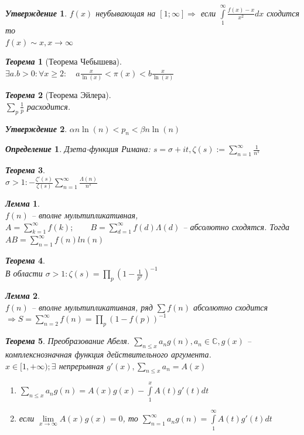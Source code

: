 \documentclass[a4paper,12pt]{article}
\newtheorem{deff2}{\textit{Определение}}
\newtheorem{teo2}{\textit{Теорема}}
\newtheorem{utv2}{\textit{Утверждение}}
\newtheorem{lem2}{\textit{Лемма}}
\newcommand{\q}{\quad}
\newcommand{\Ra}{\Rightarrow}
\newcommand{\bb}[1]{\mathbb{#1}}
\newcommand{\SL}{\sum\limits}
\newcommand{\IL}{\int\limits}
\begin{document}
\begin{utv2} $f(x)$ неубывающая на $[1;\infty]\Ra$ если $\IL_1^\infty \frac{f(x) - x}{x^2}dx$ сходится то \\$f(x)\sim x, x\to\infty$
\end{utv2}
\begin{teo2}[Теорема Чебышева]\q\\
$\exists a.b > 0: \forall x \ge 2:\q a\frac{x}{\ln(x)} <\pi(x) <b\frac{x}{\ln(x)} $
\end{teo2}
\begin{teo2}[Теорема Эйлера]\q\\$\sum_p \frac{1}{p}$ расходится.
\end{teo2}
\begin{utv2} $\alpha n \ln(n) < p_n < \beta n \ln(n)   $
\end{utv2}

\begin{deff2}
Дзета-функция Римана: $s = \sigma + it, \zeta (s) := \SL_{n=1}^\infty \frac{1}{n^s}$
\end{deff2}

\begin{teo2}\q\\
$\sigma > 1: -\frac{\zeta'(s)}{\zeta(s)}  \SL_{n=1}^\infty \frac{\Lambda(n)}{n^s} $
\end{teo2}
\begin{lem2}\q\\
$f(n)$ -- вполне мультипликативная, $A = \SL_{k=1}^\infty f(k);\q\q B = \SL_{d=1}^\infty f(d)\Lambda(d)$ -- абсолютно сходятся. Тогда $AB = \SL_{n=1}^\infty f(n) ln(n)$
\end{lem2}
\begin{teo2}\q\\
В области $\sigma > 1: \zeta(s) = \prod\limits_p (1 - \frac{1}{p^s})^{-1}$
\end{teo2}
\begin{lem2}\q\\
$f(n)$ -- вполне мультипликативная, ряд $\sum f(n)$ абсолютно сходится $\Ra S = \SL_{n=2}^\infty f(n) = \prod\limits_p (1-f(p))^{-1}  $
\end{lem2}
\begin{teo2}
Преобразование Абеля. $\SL_{n\le x} a_n g(n), a_n\in \bb{C}, g(x)$ -- комплекснозначная функция действительного аргумента.\\
$x\in[1,+\infty); \exists$ непрерывная $g'(x), \SL_{n \le x}a_n = A(x)$\\
\begin{enumerate}
    \item $\SL_{n\le x}a_ng(n) = A(x)g(x) - \IL_1^x A(t)g'(t)dt $
    \item если $\lim\limits_{x\to\infty} A(x)g(x) = 0$, то $\SL_{n=1}^\infty a_ng(n) = \IL_1^\infty A(t)g'(t)dt $
\end{enumerate}
\end{teo2}
\end{document}
